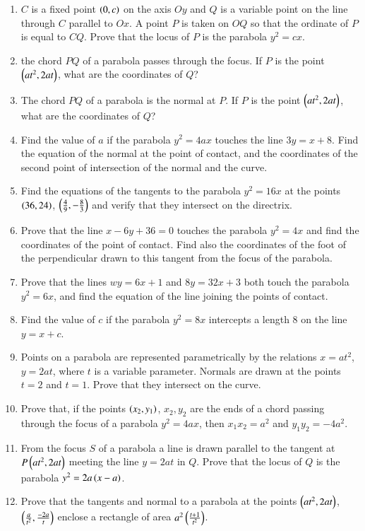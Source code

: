 \begin{enumerate}[label=\arabic*.,ref=\thesubsection.\theenumi]
\item $C$ is a fixed point $\left(0,c\right)$ on the axis $Oy$ and $Q$ is a variable point
on the line through $C$ parallel to $Ox$.  A point $P$ is taken on $OQ$ so that the ordinate
of $P$ is equal to $CQ$.  Prove that the locus of $P$ is the parabola $y^2=cx$.  
\item the chord $PQ$ of a parabola passes through the focus.  If $P$ is the point 
$\left(at^2,2at\right)$, what are the coordinates of $Q$?
\item The chord $PQ$ of a parabola is the normal at $P$.  If $P$   is the point $\left(at^2,2at\right)$,
what are the coordinates of $Q$?
\item Find the value of $a$ if the parabola $y^2=4ax$ touches the line $3y=x+8$. Find the
equation of the normal at the point of contact, and the coordinates of the second
point of intersection of the normal and the curve.
\item Find the equations of the tangents to the parabola $y^2=16x$ at the points $\left(36,24\right)$,
$\left(\frac{4}{9},-\frac{8}{3}\right)$ and verify that they intersect on the directrix.
\item Prove that the line $x-6y+36=0$ touches the parabola $y^2=4x$ and find the coordinates
of the point of contact.  Find also the coordinates of the foot of the perpendicular drawn
to this tangent from the focus of the parabola.
\item Prove that the lines $wy=6x+1$ and $8y=32x+3$  both touch the parabola $y^2=6x$,
and find the equation of the line joining the points of contact.
\item Find the value of $c$ if the parabola $y^2=8x$ intercepts a length 8  on the line
$y=x+c$.  
\item Points on a parabola are represented parametrically by the relations $x=at^2$, $y=2at$,
where $t$ is a variable parameter.  Normals are drawn at the points $t=2$ and $t=1$.  Prove that
they intersect on the curve.
\item Prove that, if the points $\left(x_2,y_1\right)$, $x_2,y_2$ are the ends of a chord passing through
the focus of a parabola $y^2=4ax$, then $x_1x_2=a^2$ and $y_1y_2=-4a^2$.  
\item From the focus $S$ of a parabola a line is drawn parallel to the tangent at $P \left(at^2,2at\right)$
meeting the line $y=2at$ in $Q$.  Prove that the locus of $Q$ is the parabola $y^2=2a\left(x-a\right)$.
\item Prove that the tangents and normal to a parabola at the points $\left(at^2,2at\right)$, $\left(\frac{a}{t^2},\frac{-2a}{t}\right)$
enclose a rectangle of area $a^2\left(\frac{t+1}{t^2}\right)$.  
\end{enumerate}
